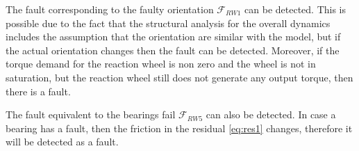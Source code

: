 The fault corresponding to the faulty orientation $\mathcal{F}_{RW1}$ can be detected. This is possible due to the fact that the structural analysis for the overall dynamics includes the assumption that the orientation are similar with the model, but if the actual orientation changes then the fault can be detected. Moreover, if the torque demand for the reaction wheel is non zero and the wheel is not in saturation, but the reaction wheel still does not generate any output torque, then there is a fault.

The fault equivalent to the bearings fail $\mathcal{F}_{RW5}$ can also be detected. In case a bearing has a fault, then the friction in the residual \ref{eq:res1} changes, therefore it will be detected as a fault.



